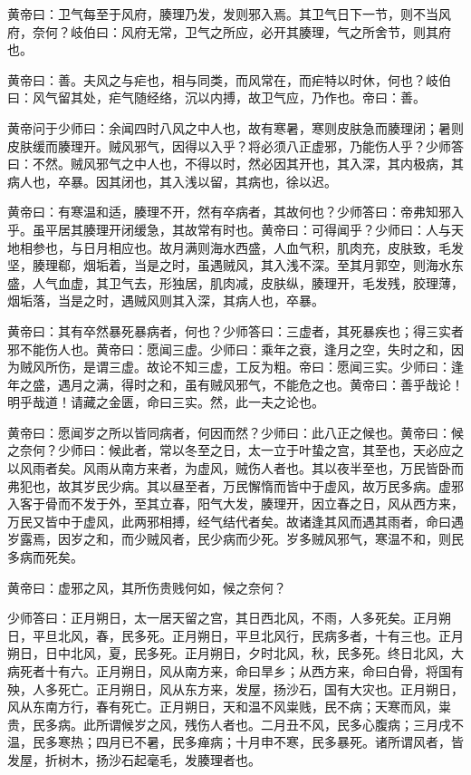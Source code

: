 \documentclass[a4paper,12pt,UTF8,twoside]{ctexbook}
\begin{document}
	黄帝曰：卫气每至于风府，腠理乃发，发则邪入焉。其卫气日下一节，则不当风府，奈何？岐伯曰：风府无常，卫气之所应，必开其腠理，气之所舍节，则其府也。
	
	黄帝曰：善。夫风之与疟也，相与同类，而风常在，而疟特以时休，何也？岐伯曰：风气留其处，疟气随经络，沉以内搏，故卫气应，乃作也。帝曰：善。
	
	黄帝问于少师曰：余闻四时八风之中人也，故有寒暑，寒则皮肤急而腠理闭；暑则皮肤缓而腠理开。贼风邪气，因得以入乎？将必须八正虚邪，乃能伤人乎？少师答曰：不然。贼风邪气之中人也，不得以时，然必因其开也，其入深，其内极病，其病人也，卒暴。因其闭也，其入浅以留，其病也，徐以迟。
	
	黄帝曰：有寒温和适，腠理不开，然有卒病者，其故何也？少师答曰：帝弗知邪入乎。虽平居其腠理开闭缓急，其故常有时也。黄帝曰：可得闻乎？少师曰：人与天地相参也，与日月相应也。故月满则海水西盛，人血气积，肌肉充，皮肤致，毛发坚，腠理郗，烟垢着，当是之时，虽遇贼风，其入浅不深。至其月郭空，则海水东盛，人气血虚，其卫气去，形独居，肌肉减，皮肤纵，腠理开，毛发残，胶理薄，烟垢落，当是之时，遇贼风则其入深，其病人也，卒暴。
	
	黄帝曰：其有卒然暴死暴病者，何也？少师答曰：三虚者，其死暴疾也；得三实者邪不能伤人也。黄帝曰：愿闻三虚。少师曰：乘年之衰，逢月之空，失时之和，因为贼风所伤，是谓三虚。故论不知三虚，工反为粗。帝曰：愿闻三实。少师曰：逢年之盛，遇月之满，得时之和，虽有贼风邪气，不能危之也。黄帝曰：善乎哉论！明乎哉道！请藏之金匮，命曰三实。然，此一夫之论也。
	
	黄帝曰：愿闻岁之所以皆同病者，何因而然？少师曰：此八正之候也。黄帝曰：候之奈何？少师曰：候此者，常以冬至之日，太一立于叶蛰之宫，其至也，天必应之以风雨者矣。风雨从南方来者，为虚风，贼伤人者也。其以夜半至也，万民皆卧而弗犯也，故其岁民少病。其以昼至者，万民懈惰而皆中于虚风，故万民多病。虚邪入客于骨而不发于外，至其立春，阳气大发，腠理开，因立春之日，风从西方来，万民又皆中于虚风，此两邪相搏，经气结代者矣。故诸逢其风而遇其雨者，命曰遇岁露焉，因岁之和，而少贼风者，民少病而少死。岁多贼风邪气，寒温不和，则民多病而死矣。
	
	黄帝曰：虚邪之风，其所伤贵贱何如，候之奈何？
	
	少师答曰：正月朔日，太一居天留之宫，其日西北风，不雨，人多死矣。正月朔日，平旦北风，春，民多死。正月朔日，平旦北风行，民病多者，十有三也。正月朔日，日中北风，夏，民多死。正月朔日，夕时北风，秋，民多死。终日北风，大病死者十有六。正月朔日，风从南方来，命曰旱乡；从西方来，命曰白骨，将国有殃，人多死亡。正月朔日，风从东方来，发屋，扬沙石，国有大灾也。正月朔日，风从东南方行，春有死亡。正月朔日，天和温不风粜贱，民不病；天寒而风，粜贵，民多病。此所谓候岁之风，残伤人者也。二月丑不风，民多心腹病；三月戌不温，民多寒热；四月已不暑，民多瘅病；十月申不寒，民多暴死。诸所谓风者，皆发屋，折树木，扬沙石起毫毛，发腠理者也。
	
\end{document}

